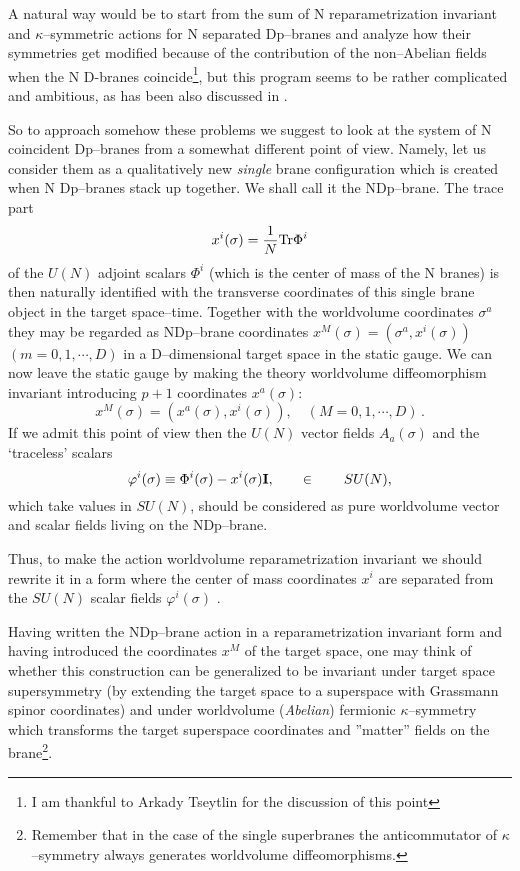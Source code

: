 \documentclass[a4paper,12pt]{article}
\begin{document}
A natural way would be to start from the sum of N
reparametrization invariant and $\kappa$--symmetric actions for N
separated Dp--branes and analyze how their symmetries get modified
because of the contribution of the non--Abelian fields when the N
D-branes coincide\footnote{I am thankful to Arkady Tseytlin for
the discussion of this point}, but this program seems to be rather
complicated and ambitious, as has been also discussed in
\cite{Bergshoeff:2001kt}.

So to approach somehow these problems we suggest to look at the system
of N coincident Dp--branes from a somewhat different
point of view. Namely, let us consider them as a
qualitatively new
{\it single} brane configuration which is created when N
Dp--branes stack up together. We shall call it the NDp--brane. The
trace part
\begin{equation}\label{trace}
x^i(\sigma)={1\over{N}}{\rm Tr}\Phi^i
\end{equation}
 of the $U(N)$ adjoint scalars $\Phi^i$
(which is the center of mass of the N branes) is then naturally
identified with the transverse coordinates of this single brane
object in the target space--time. Together with the worldvolume
coordinates $\sigma^a$ they may be regarded as NDp--brane
coordinates $x^M(\sigma)=(\sigma^a, x^i(\sigma))$
$(m=0,1,\cdots, D)$ in a D--dimensional target space in the static
gauge. We can now leave the static gauge by making the theory
worldvolume diffeomorphism invariant introducing $p+1$ coordinates
$x^a(\sigma)$:
\begin{equation}\label{3}
x^M(\sigma)=(x^a(\sigma), x^i(\sigma)),
\quad (M=0,1,\cdots, D)\,.
\end{equation}
If we admit this point of view then the $U(N)$ vector fields
$A_a(\sigma)$ and the `traceless' scalars
\begin{equation}\label{4}
\varphi^i(\sigma)\equiv \Phi^i(\sigma)-x^i(\sigma) {\bf I}, \qquad \in
\qquad SU(N),
\end{equation}
which take values in $SU(N)$, should
be considered as pure worldvolume vector and scalar fields living
on the NDp--brane.

Thus, to make the action  worldvolume reparametrization
invariant we should rewrite it in a form where the center of mass
coordinates $x^i$  are separated from the $SU(N)$ scalar
fields $\varphi^i(\sigma)$ .

Having written the NDp--brane action in a reparametrization
invariant form and having introduced the coordinates $x^M$ of the
target space, one may think of whether this construction can be
generalized to be invariant under target space supersymmetry (by
extending the target space to a superspace with Grassmann spinor
coordinates) and under worldvolume ({\it Abelian}) fermionic
$\kappa$--symmetry which transforms the target superspace
coordinates and ''matter'' fields on the brane\footnote{Remember that in the case of
the single superbranes the anticommutator of $\kappa$--symmetry
always generates worldvolume diffeomorphisms.}.
\end{document}
